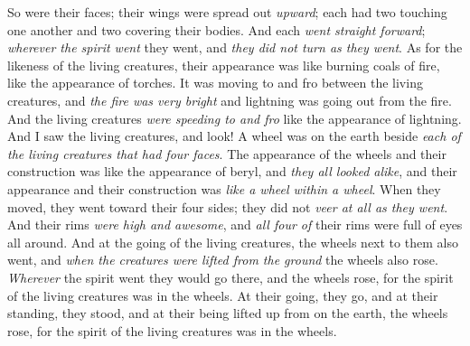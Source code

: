 \begin{biblechapter}
\verse So were their faces; their wings were spread out \textit{upward}; each had two touching one another and two covering their bodies.
\verse And each \textit{went straight forward}; \textit{wherever the spirit went} they went, and \textit{they did not turn as they went}.
\verse As for the likeness of the living creatures, their appearance was like burning coals of fire, like the appearance of torches. It was moving to and fro between the living creatures, and \textit{the fire was very bright} and lightning was going out from the fire.
\verse And the living creatures \textit{were speeding to and fro} like the appearance of lightning.
\verse And I saw the living creatures, and look! A wheel was on the earth beside \textit{each of the living creatures that had four faces}.
\verse The appearance of the wheels and their construction was like the appearance of beryl, and \textit{they all looked alike}, and their appearance and their construction was \textit{like a wheel within a wheel}.
\verse When they moved, they went toward their four sides; they did not \textit{veer at all as they went}.
\verse And their rims \textit{were high and awesome}, and \textit{all four of} their rims were full of eyes all around.
\verse And at the going of the living creatures, the wheels next to them also went, and \textit{when the creatures were lifted from the ground} the wheels also rose.
\verse \textit{Wherever} the spirit went they would go there, and the wheels rose, for the spirit of the living creatures was in the wheels.
\verse At their going, they go, and at their standing, they stood, and at their being lifted up from on the earth, the wheels rose, for the spirit of the living creatures was in the wheels.

\end{biblechapter}
